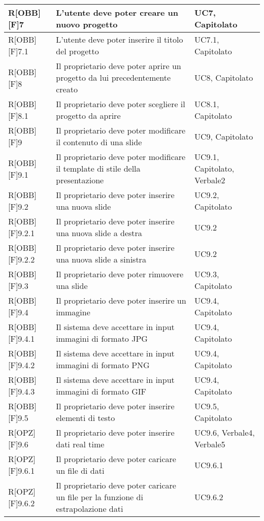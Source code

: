 	\begin{table}[h]
		\begin{tabular}{|p{}|p{}|p{}|}
			\midrule
			R[OBB][F]7 & L'utente deve poter creare un nuovo progetto & UC7, Capitolato \\ \midrule
			R[OBB][F]7.1 & L'utente deve poter inserire il titolo del progetto & UC7.1, Capitolato \\ \midrule
			R[OBB][F]8 & Il proprietario deve poter aprire un progetto da lui precedentemente creato & UC8, Capitolato \\ \midrule
			R[OBB][F]8.1 & Il proprietario deve poter scegliere il progetto da aprire & UC8.1, Capitolato \\ \midrule
			R[OBB][F]9 & Il proprietario deve poter modificare il contenuto di una \gls{slide} & UC9, Capitolato \\ \midrule
			R[OBB][F]9.1 & Il proprietario deve poter modificare il \gls{template} di stile della presentazione & UC9.1, Capitolato, Verbale2 \\ \midrule
			R[OBB][F]9.2 & Il proprietario deve poter inserire una nuova \gls{slide} & UC9.2, Capitolato \\ \midrule
			R[OBB][F]9.2.1 & Il proprietario deve poter inserire una nuova \gls{slide} a destra & UC9.2 \\ \midrule
			R[OBB][F]9.2.2 & Il proprietario deve poter inserire una nuova \gls{slide} a sinistra & UC9.2 \\ \midrule
			R[OBB][F]9.3 & Il proprietario deve poter rimuovere una \gls{slide} & UC9.3, Capitolato \\ \midrule
			R[OBB][F]9.4 & Il proprietario deve poter inserire un immagine & UC9.4, Capitolato \\ \midrule
			R[OBB][F]9.4.1 & Il sistema deve accettare in input immagini di formato JPG & UC9.4, Capitolato \\ \midrule
			R[OBB][F]9.4.2 & Il sistema deve accettare in input immagini di formato \gls{PNG} & UC9.4, Capitolato \\ \midrule
			R[OBB][F]9.4.3 & Il sistema deve accettare in input immagini di formato GIF & UC9.4, Capitolato \\ \midrule
			R[OBB][F]9.5 & Il proprietario deve poter inserire elementi di testo & UC9.5, Capitolato \\ \midrule
			R[OPZ][F]9.6 & Il proprietario deve poter inserire dati \gls{real time} & UC9.6, Verbale4, Verbale5 \\ \midrule
			R[OPZ][F]9.6.1 & Il proprietario deve poter caricare un file di dati & UC9.6.1 \\ \midrule
			R[OPZ][F]9.6.2 & Il proprietario deve poter caricare un file per la funzione di estrapolazione dati & UC9.6.2 \\ \midrule
		\end{tabular}
	\end{table}
	\newpage

